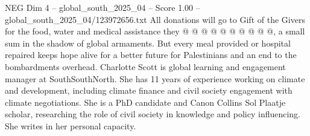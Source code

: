 \begin{textsample}{NEG Dim 4 – global\_south\_2025\_04 – Score 1.00 – global\_south\_2025\_04/123972656.txt}
All donations will go to Gift of the Givers for the food, water and medical assistance they @ @ @ @ @ @ @ @ @ @, a small sum in the shadow of global armaments.
But every meal provided or hospital repaired keeps hope alive for a better future for Palestinians and an end to the bombardments overhead.
Charlotte Scott is global learning and engagement manager at SouthSouthNorth.
She has 11 years of experience working on climate and development, including climate finance and civil society engagement with climate negotiations.
She is a PhD candidate and Canon Collins Sol Plaatje scholar, researching the role of civil society in knowledge and policy influencing.
She writes in her personal capacity.

\end{textsample}
